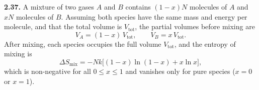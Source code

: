 \textbf{2.37.} A mixture of two gases $A$ and $B$ contains $(1-x)N$ molecules of $A$ and $xN$
molecules of $B$. Assuming both species have the same mass and energy per molecule, and that the
total volume is $V_{\text{tot}}$, the partial volumes before mixing are
\[
  V_A = (1-x)\,V_{\text{tot}}, \qquad V_B = x\,V_{\text{tot}}.
\]
After mixing, each species occupies the full volume $V_{\text{tot}}$, and the entropy of mixing is
\[
  \Delta S_{\text{mix}} = -Nk\bigl[(1-x)\ln(1-x) + x\ln x\bigr],
\]
which is non-negative for all $0 \leq x \leq 1$ and vanishes only for pure species ($x = 0$ or
$x = 1$).
